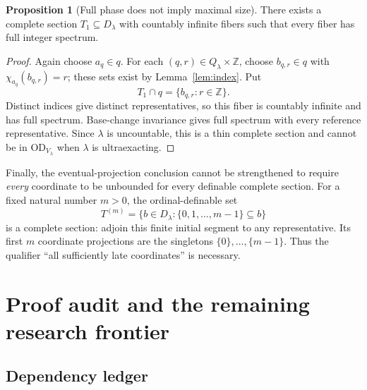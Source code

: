 \documentclass[11pt,letterpaper]{article}
\theoremstyle{definition}
\newtheorem{proposition}[definition]{Proposition}
\newcommand{\OD}{\mathrm{OD}}
\numberwithin{equation}{section}
\newcommand{\ZZ}{\mathbb Z}
\newcommand{\ch}{\chi}
\begin{document}
\begin{proposition}[Full phase does not imply maximal size]\label{prop:phase-control}
There exists a complete section $T_1\subseteq D_\lambda$ with countably infinite fibers such that every fiber has full integer spectrum.
\end{proposition}
\begin{proof}
Again choose $a_q\in q$. For each $(q,r)\in Q_\lambda\times\ZZ$, choose $b_{q,r}\in q$ with $\ch_{a_q}(b_{q,r})=r$; these sets exist by Lemma~\ref{lem:index}. Put
\[
T_1\cap q=\{b_{q,r}:r\in\ZZ\}.
\]
Distinct indices give distinct representatives, so this fiber is countably infinite and has full spectrum. Base-change invariance gives full spectrum with every reference representative. Since $\lambda$ is uncountable, this is a thin complete section and cannot be in $\OD_{V_\lambda}$ when $\lambda$ is ultraexacting.
\end{proof}

Finally, the eventual-projection conclusion cannot be strengthened to require \emph{every} coordinate to be unbounded for every definable complete section. For a fixed natural number $m>0$, the ordinal-definable set
\[
T^{(m)}=\{b\in D_\lambda:\{0,1,\ldots,m-1\}\subseteq b\}
\]
is a complete section: adjoin this finite initial segment to any representative. Its first $m$ coordinate projections are the singletons $\{0\},\ldots,\{m-1\}$. Thus the qualifier ``all sufficiently late coordinates'' is necessary.

\section{Proof audit and the remaining research frontier}\label{sec:audit}

\subsection{Dependency ledger}
\end{document}
